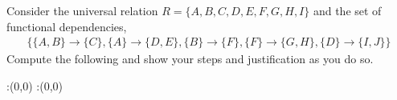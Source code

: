 



\question Consider the universal relation $R=\{A,B,C,D,E,F,G,H,I\}$ and
the set of functional dependencies,
\begin{align}
  \{\{A,B\}\rightarrow \{C\},
  \{A\}\rightarrow\{D,E\},
  \{B\}\rightarrow\{F\},
  \{F\}\rightarrow\{G,H\},
  \{D\}\rightarrow\{I,J\}\} \nonumber
\end{align}
Compute the following and show your steps and justification as you do so.

\watchout

\ifprintanswers
  \begin{marginfigure}
      :(0,0)
      :(0,0)
    \figdrawbegin{}
      \figdrawline [100,101]
    \figdrawend
    \figvisu{\figBoxA}{}{%
    }
    \centerline{\box\figBoxA}
  \end{marginfigure}
\fi 

